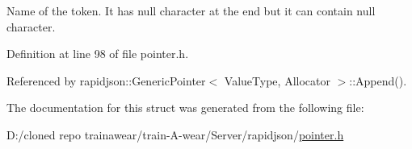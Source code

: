 Name of the token. It has null character at the end but it can contain null character. 



Definition at line 98 of file pointer.\+h.



Referenced by rapidjson\+::\+Generic\+Pointer$<$ Value\+Type, Allocator $>$\+::\+Append().



The documentation for this struct was generated from the following file\+:\begin{DoxyCompactItemize}
\item 
D\+:/cloned repo trainawear/train-\/\+A-\/wear/\+Server/rapidjson/\mbox{\hyperlink{pointer_8h}{pointer.\+h}}\end{DoxyCompactItemize}
